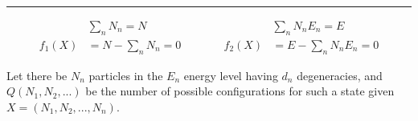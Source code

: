 \documentclass[12pt]{article}
\begin{document}
\vspace{10pt} \noindent
\rule[0pt]{1\textwidth}{.5pt}

\[\begin{aligned}
    &\sum_n N_n = N &       &\sum_n N_n E_n = E\\
    f_1(X) &= N - \sum_n N_n = 0 & \hspace{18pt} \hspace{18pt} f_2(X) &= E - \sum_n N_n E_n = 0
\end{aligned}\]

Let there be \(N_n\) particles in the \(E_n\) energy level having \(d_n\) degeneracies, and
\(Q(N_1, N_2, ...)\) be the number of possible configurations for such a state given \(X = (N_1, N_2, ..., N_n)\).

\vspace{25pt} \noindent
\end{document}
